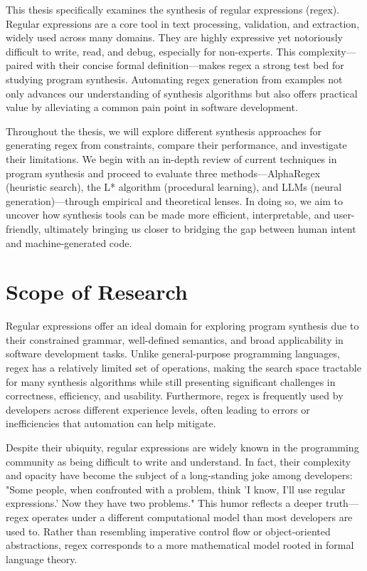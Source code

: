 \indent\indent This thesis specifically examines the synthesis of regular expressions (regex). Regular expressions are a core tool in text processing, validation, and extraction, widely used across many domains. They are highly expressive yet notoriously difficult to write, read, and debug, especially for non-experts. This complexity—paired with their concise formal definition—makes regex a strong test bed for studying program synthesis. Automating regex generation from examples not only advances our understanding of synthesis algorithms but also offers practical value by alleviating a common pain point in software development.

\indent\indent Throughout the thesis, we will explore different synthesis approaches for generating regex from constraints, compare their performance, and investigate their limitations. We begin with an in-depth review of current techniques in program synthesis and proceed to evaluate three methods—AlphaRegex (heuristic search), the L* algorithm (procedural learning), and LLMs (neural generation)—through empirical and theoretical lenses. In doing so, we aim to uncover how synthesis tools can be made more efficient, interpretable, and user-friendly, ultimately bringing us closer to bridging the gap between human intent and machine-generated code.

\vspace{-0.4em}
\section{Scope of Research}
\vspace{-0.4em}

\indent\indent Regular expressions offer an ideal domain for exploring program synthesis due to their constrained grammar, well-defined semantics, and broad applicability in software development tasks. Unlike general-purpose programming languages, regex has a relatively limited set of operations, making the search space tractable for many synthesis algorithms while still presenting significant challenges in correctness, efficiency, and usability. Furthermore, regex is frequently used by developers across different experience levels, often leading to errors or inefficiencies that automation can help mitigate.

\indent\indent Despite their ubiquity, regular expressions are widely known in the programming community as being difficult to write and understand. In fact, their complexity and opacity have become the subject of a long-standing joke among developers: "Some people, when confronted with a problem, think 'I know, I'll use regular expressions.' Now they have two problems." This humor reflects a deeper truth—regex operates under a different computational model than most developers are used to. Rather than resembling imperative control flow or object-oriented abstractions, regex corresponds to a more mathematical model rooted in formal language theory.

